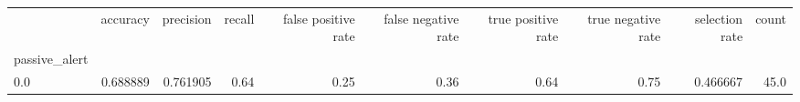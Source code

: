 \begin{tabular}{lrrrrrrrrr}
\toprule
{} &  accuracy &  precision &  recall &  false positive rate &  false negative rate &  true positive rate &  true negative rate &  selection rate &  count \\
passive\_alert &           &            &         &                      &                      &                     &                     &                 &        \\
\midrule
0.0           &  0.688889 &   0.761905 &    0.64 &                 0.25 &                 0.36 &                0.64 &                0.75 &        0.466667 &   45.0 \\
\bottomrule
\end{tabular}
